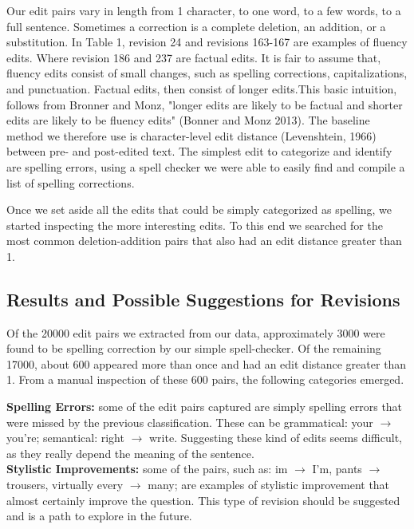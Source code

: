 \documentclass[11pt, oneside]{article}   	%
\begin{document}
Our edit pairs vary in length from 1 character, to one word, to a few words, to a full sentence. Sometimes a correction is a complete deletion, an addition, or a substitution. In Table 1, revision 24 and revisions 163-167 are examples of fluency edits. Where revision 186 and 237 are factual edits. It is fair to assume that, fluency edits consist of small changes, such as spelling corrections, capitalizations, and punctuation. Factual edits, then consist of longer edits.This basic intuition, follows from Bronner and Monz, "longer edits are likely to be factual and shorter edits are likely to be fluency edits" (Bonner and Monz 2013). The baseline method we therefore use is character-level edit distance (Levenshtein, 1966) between pre- and post-edited text. The simplest edit to categorize and identify are spelling errors, using a spell checker we were able to easily find and compile a list of spelling corrections.

Once we set aside all the edits that could be simply categorized as spelling, we started inspecting the more interesting edits. To this end we searched for the most common deletion-addition pairs that also had an edit distance greater than 1. 

\subsection{Results and Possible Suggestions for Revisions}
Of the 20000 edit pairs we extracted from our data, approximately 3000 were found to be spelling correction by our simple spell-checker. Of the remaining 17000, about 600 appeared more than once and had an edit distance greater than 1. From a manual inspection of these 600 pairs, the following categories emerged.
\newline

{\bfseries Spelling Errors:} some of the edit pairs captured are simply spelling errors that were missed by the previous classification. These can be grammatical: your $\rightarrow$ you're; semantical: right $\rightarrow$ write. Suggesting these kind of edits seems difficult, as they really depend the meaning of the sentence.\\

{\bfseries Stylistic Improvements:} some of the pairs, such as: im $\rightarrow$ I'm, pants $\rightarrow$ trousers, virtually every $\rightarrow$ many; are examples of stylistic improvement that almost certainly improve the question. This type of revision should be suggested and is a path to explore in the future.\\
\end{document}
